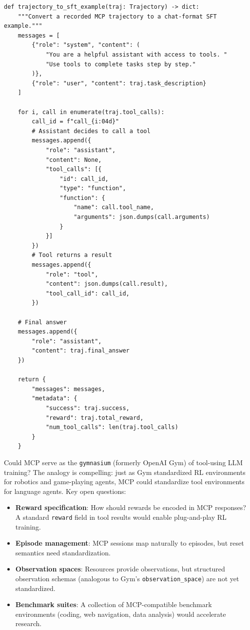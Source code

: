 \begin{lstlisting}[style=pythonstyle, caption={Converting MCP Trajectories to SFT Training Examples}]
def trajectory_to_sft_example(traj: Trajectory) -> dict:
    """Convert a recorded MCP trajectory to a chat-format SFT example."""
    messages = [
        {"role": "system", "content": (
            "You are a helpful assistant with access to tools. "
            "Use tools to complete tasks step by step."
        )},
        {"role": "user", "content": traj.task_description}
    ]

    for i, call in enumerate(traj.tool_calls):
        call_id = f"call_{i:04d}"
        # Assistant decides to call a tool
        messages.append({
            "role": "assistant",
            "content": None,
            "tool_calls": [{
                "id": call_id,
                "type": "function",
                "function": {
                    "name": call.tool_name,
                    "arguments": json.dumps(call.arguments)
                }
            }]
        })
        # Tool returns a result
        messages.append({
            "role": "tool",
            "content": json.dumps(call.result),
            "tool_call_id": call_id,
        })

    # Final answer
    messages.append({
        "role": "assistant",
        "content": traj.final_answer
    })

    return {
        "messages": messages,
        "metadata": {
            "success": traj.success,
            "reward": traj.total_reward,
            "num_tool_calls": len(traj.tool_calls)
        }
    }
\end{lstlisting}

\begin{questionbox}
Could MCP serve as the \texttt{gymnasium} (formerly OpenAI Gym) of tool-using LLM training? The analogy is compelling: just as Gym standardized RL environments for robotics and game-playing agents, MCP could standardize tool environments for language agents. Key open questions:

\begin{itemize}
  \item \textbf{Reward specification}: How should rewards be encoded in MCP responses? A standard \texttt{reward} field in tool results would enable plug-and-play RL training.
  \item \textbf{Episode management}: MCP sessions map naturally to episodes, but reset semantics need standardization.
  \item \textbf{Observation spaces}: Resources provide observations, but structured observation schemas (analogous to Gym’s \texttt{observation\_space}) are not yet standardized.
  \item \textbf{Benchmark suites}: A collection of MCP-compatible benchmark environments (coding, web navigation, data analysis) would accelerate research.
\end{itemize}
\end{questionbox}

